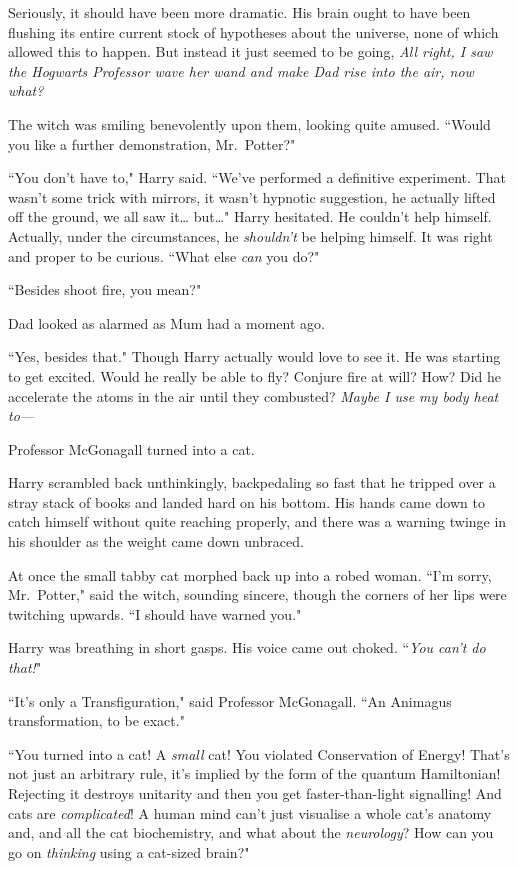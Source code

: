 Seriously, it should have been more dramatic. His brain ought to have been flushing its entire current stock of hypotheses about the universe, none of which allowed this to happen. But instead it just seemed to be going, \emph{All right, I saw the Hogwarts Professor wave her wand and make Dad rise into the air, now what?}

The witch was smiling benevolently upon them, looking quite amused. ``Would you like a further demonstration, Mr.~Potter?"

``You don't have to," Harry said. ``We've performed a definitive experiment. That wasn't some trick with mirrors, it wasn't hypnotic suggestion, he actually lifted off the ground, we all saw it{\ldots} but{\ldots}" Harry hesitated. He couldn't help himself. Actually, under the circumstances, he \emph{shouldn't} be helping himself. It was right and proper to be curious. ``What else \emph{can} you do?"

``Besides shoot fire, you mean?"

Dad looked as alarmed as Mum had a moment ago.

``Yes, besides that." Though Harry actually would love to see it. He was starting to get excited. Would he really be able to fly? Conjure fire at will? How? Did he accelerate the atoms in the air until they combusted? \emph{Maybe I use my body heat to---}

Professor McGonagall turned into a cat.

Harry scrambled back unthinkingly, backpedaling so fast that he tripped over a stray stack of books and landed hard on his bottom. His hands came down to catch himself without quite reaching properly, and there was a warning twinge in his shoulder as the weight came down unbraced.

At once the small tabby cat morphed back up into a robed woman. ``I'm sorry, Mr.~Potter," said the witch, sounding sincere, though the corners of her lips were twitching upwards. ``I should have warned you."

Harry was breathing in short gasps. His voice came out choked. ``\emph{You can't \emph{do} that!}"

``It's only a Transfiguration," said Professor McGonagall. ``An Animagus transformation, to be exact."

``You turned into a cat! A \emph{small} cat! You violated Conservation of Energy! That's not just an arbitrary rule, it's implied by the form of the quantum Hamiltonian! Rejecting it destroys unitarity and then you get faster-than-light signalling! And cats are \emph{complicated}! A human mind can't just visualise a whole cat's anatomy and, and all the cat biochemistry, and what about the \emph{neurology}? How can you go on \emph{thinking} using a cat-sized brain?"


